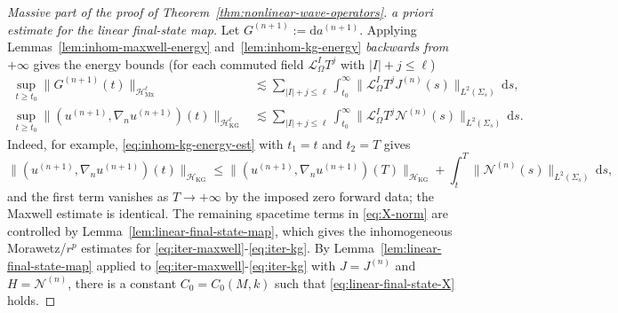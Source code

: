 \documentclass[11pt]{article}
\numberwithin{equation}{section}
\theoremstyle{plain}
\theoremstyle{definition}
\theoremstyle{remark}
\newcommand{\dd}{\mathrm{d}}
\begin{document}
\begin{proof}[Massive part of the proof of Theorem~\ref{thm:nonlinear-wave-operators}]
\medskip
\noindent\textit{a priori estimate for the linear final-state map.}
Let $G^{(n+1)}:=\dd a^{(n+1)}$.
Applying Lemmas~\ref{lem:inhom-maxwell-energy} and~\ref{lem:inhom-kg-energy} \emph{backwards from $+\infty$} gives the energy bounds (for each commuted field $\mathcal L_{\Omega}^{I}T^{j}$ with $|I|+j\le\ell$)
\begin{eqnarray}
\sup_{t\ge t_0}\|G^{(n+1)}(t)\|_{\mathcal H_{\mathrm{Mx}}^{\ell}}
&\lesssim
\sum_{|I|+j\le\ell}\int_{t_0}^{\infty}\|\mathcal L_{\Omega}^{I}T^{j}J^{(n)}(s)\|_{L^{2}(\Sigma_s)}\,\dd s,
\label{eq:iter-energy-maxwell}
\\
\sup_{t\ge t_0}\|(u^{(n+1)},\nabla_n u^{(n+1)})(t)\|_{\mathcal H_{\mathrm{KG}}^{\ell}}
&\lesssim
\sum_{|I|+j\le\ell}\int_{t_0}^{\infty}\|\mathcal L_{\Omega}^{I}T^{j}\mathcal N^{(n)}(s)\|_{L^{2}(\Sigma_s)}\,\dd s.
\label{eq:iter-energy-kg}
\end{eqnarray}
Indeed, for example, \eqref{eq:inhom-kg-energy-est} with $t_1=t$ and $t_2=T$ gives
\begin{equation}
\|(u^{(n+1)},\nabla_n u^{(n+1)})(t)\|_{\mathcal H_{\mathrm{KG}}}
\le
\|(u^{(n+1)},\nabla_n u^{(n+1)})(T)\|_{\mathcal H_{\mathrm{KG}}}
+
\int_{t}^{T}\|\mathcal N^{(n)}(s)\|_{L^2(\Sigma_s)}\,\dd s,
\end{equation}
and the first term vanishes as $T\to+\infty$ by the imposed zero forward data; the Maxwell estimate is identical.
The remaining spacetime terms in \eqref{eq:X-norm} are controlled by Lemma~\ref{lem:linear-final-state-map}, which gives the inhomogeneous Morawetz/$r^{p}$ estimates for \eqref{eq:iter-maxwell}-\eqref{eq:iter-kg}.
By Lemma~\ref{lem:linear-final-state-map} applied to \eqref{eq:iter-maxwell}-\eqref{eq:iter-kg} with $J=J^{(n)}$ and $H=\mathcal N^{(n)}$, there is a constant $C_{0}=C_{0}(M,k)$ such that \eqref{eq:linear-final-state-X} holds.


\end{proof}
\end{document}
